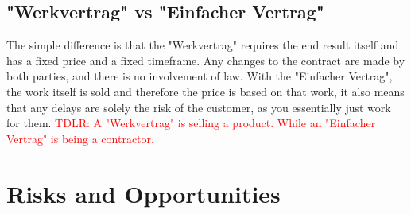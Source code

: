 \documentclass[main.tex,fontsize=12pt,paper=a4,paper=landscape,DIV=calc,]{scrartcl}
\begin{document}
\begin{multicols*}{2}
\subsection{"Werkvertrag" vs "Einfacher Vertrag"} 
The simple difference is that the "Werkvertrag" requires the end result itself and has a fixed price and a fixed timeframe.\newline
Any changes to the contract are made by both parties, and there is no involvement of law.\newline
With the "Einfacher Vertrag", the work itself is sold and therefore the price is based on that work, it also means that any delays are solely the risk of the customer, as you essentially just work for them.\newline
\textcolor{red}{TDLR: A "Werkvertrag" is selling a product. While an "Einfacher Vertrag" is being a contractor.}

\section{Risks and Opportunities}


\end{multicols*}
\end{document}
